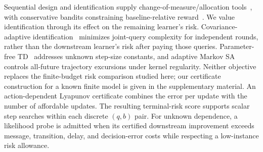 \documentclass[journal]{IEEEtran}
\begin{document}
Sequential design and identification supply change-of-measure/allocation tools~\cite{chernoff1959sequential,nitinawarat2015controlled,kaufmann2016complexity,garivier2016optimal,moulos2019markovian,saad2023covariance,vannella2023multiagent}, with conservative bandits constraining baseline-relative reward~\cite{wu2016conservative}.
We value identification through its effect on the remaining learner's risk.
Covariance-adaptive identification~\cite{saad2023covariance} minimizes joint-query complexity for independent rounds, rather than the downstream learner's risk after paying those queries.
Parameter-free TD~\cite{li2026parameterfree} addresses unknown step-size constants, and adaptive Markov SA~\cite{li2026shrinkingtube} controls all-future trajectory excursions under kernel regularity.
Neither objective replaces the finite-budget risk comparison studied here; our certificate construction for a known finite model is given in the supplementary material.
An action-dependent Lyapunov certificate combines the error per update with the number of affordable updates.
The resulting terminal-risk score supports scalar step searches within each discrete $(q,b)$ pair.
For unknown dependence, a likelihood probe is admitted when its certified downstream improvement exceeds message, transition, delay, and decision-error costs while respecting a low-instance risk allowance.
\end{document}
